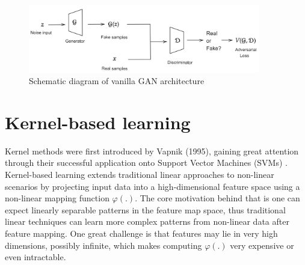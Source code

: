 \begin{figure}[H]
    \centering
    \includegraphics[width = 0.9\textwidth]{Figures/LR/GAN-schematics.png}
    \caption{Schematic diagram of vanilla GAN architecture}
    \label{GAN-schematic}
\end{figure}


\section{Kernel-based learning}
\label{sec-kernelbasedlearning}
Kernel methods were first introduced by Vapnik (1995), gaining great attention through their successful application onto Support Vector Machines (SVMs) \cite{vapnikNatureStatisticalLearning2000,cortesSupportvectorNetworks1995}. Kernel-based learning extends traditional linear approaches to non-linear scenarios by projecting input data into a high-dimensional feature space using a non-linear mapping function $\varphi(.)$. The core motivation behind that is one can expect linearly separable patterns in the feature map space, thus traditional linear techniques can learn more complex patterns from non-linear data after feature mapping. One great challenge is that features may lie in very high dimensions, possibly infinite, which makes computing $\varphi(.)$ very expensive or even intractable. 

